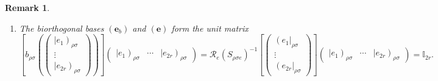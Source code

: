 \documentclass[aps,preprint]{revtex4}
\newtheorem{remark}[theorem]{Remark}
\begin{document}
\begin{remark}
\begin{enumerate}
\begin{enumerate}
\item The biorthogonal bases $\left( \mathbf{e}_{b}\right) $ and $\left( 
\mathbf{e}\right) $ form the unit matrix%
\begin{equation}
\left[ b_{\rho \sigma }\left( \left( 
\begin{array}{c}
\left\vert e_{1}\right) _{\rho \sigma } \\ 
\vdots \\ 
\left\vert e_{2r}\right) _{\rho \sigma }%
\end{array}%
\right) \right) \right] \left( 
\begin{array}{ccc}
\left\vert e_{1}\right) _{\rho \sigma } & \cdots & \left\vert e_{2r}\right)
_{\rho \sigma }%
\end{array}%
\right) =\mathcal{R}_{e}\left( S_{\rho \sigma e}\right) ^{-1}\left[ \left( 
\begin{array}{c}
\left( e_{1}\right\vert _{\rho \sigma } \\ 
\vdots \\ 
\left( e_{2r}\right\vert _{\rho \sigma }%
\end{array}%
\right) \right] \left( 
\begin{array}{ccc}
\left\vert e_{1}\right) _{\rho \sigma } & \cdots & \left\vert e_{2r}\right)
_{\rho \sigma }%
\end{array}%
\right) =\mathbb{I}_{2r}.
\end{equation}


\end{enumerate}
\end{enumerate}
\end{remark}
\end{document}
